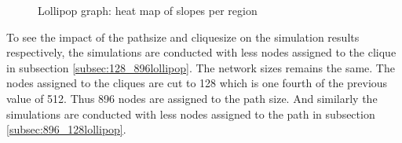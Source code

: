 \begin{figure}
    \centering
    \caption{Lollipop graph: heat map of slopes per region}
    \label{fig:lollipopslopes}
\end{figure}

To see the impact of the pathsize and cliquesize on the simulation results respectively, the simulations are conducted with less nodes assigned to the clique in subsection \ref{subsec:128_896lollipop}. The network sizes remains the same. The nodes assigned to the cliques are cut to 128 which is one fourth of the previous value of 512. Thus 896 nodes are assigned to the path size. And similarly the simulations are conducted with less nodes assigned to the path in subsection \ref{subsec:896_128lollipop}.  


